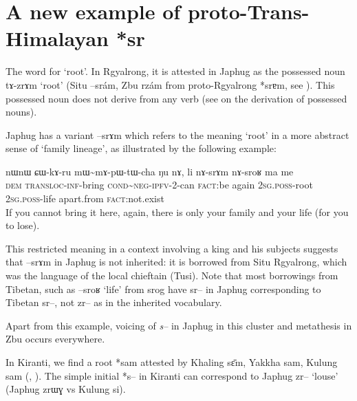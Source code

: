 \documentclass[oldfontcommands,oneside,a4paper,11pt]{article}
\newcommand{\ipa}[1]{{\phon #1}} %
\begin{document}
\section{A new example of proto-Trans-Himalayan *\ipa{sr}}


The word for `root'. In Rgyalrong, it is attested in Japhug as the possessed noun \ipa{tɤ-zrɤm} `root' (Situ \ipa{--srám}, Zbu \ipa{rzám} from proto-Rgyalrong *\ipa{srɐm}, see \citealt[243]{jacques04these}). This possessed noun does not derive from any verb (see \citealt[3-7]{jacques14antipassive} on the derivation of possessed nouns).

Japhug has a variant \ipa{--srɤm} which refers to the meaning `root' in a more abstract sense of `family lineage', as illustrated by the following example:

\begin{exe}
\ex \label{ex:sram}
\gll
\ipa{nɯnɯ} 	\ipa{ɕɯ-kɤ-ru} 	\ipa{mɯ\textasciitilde{}mɤ-pɯ-tɯ-cha} 	\ipa{ŋu} 	\ipa{nɤ,} 	\ipa{li} 	\ipa{nɤ-srɤm} 	\ipa{nɤ-sroʁ} 	\ipa{ma} 	\ipa{me} \\
\textsc{dem} \textsc{transloc-inf}-bring \textsc{cond\textasciitilde{}neg-ipfv}-2-can \textsc{fact}:be again \textsc{2sg.poss}-root \textsc{2sg.poss}-life apart.from \textsc{fact}:not.exist\\
\glt If you cannot bring it here, again, there is only your family and your life (for you to lose).
\end{exe}

This restricted meaning in a context involving a king and his subjects suggests that \ipa{--srɤm} in Japhug is not inherited: it is borrowed from Situ Rgyalrong, which was the language of the local chieftain (Tusi). Note that most borrowings from Tibetan, such as \ipa{--sroʁ} `life' from \ipa{srog} have \ipa{sr--} in Japhug corresponding to Tibetan \ipa{sr--}, not \ipa{zr--} as in the inherited vocabulary.

Apart from this example, voicing of \textit{s--} in Japhug in this cluster and metathesis in Zbu occurs everywhere.

In Kiranti, we find a root *sam attested by Khaling \ipa{sɛ̄m}, Yakkha  \ipa{sam}, Kulung \ipa{sam} (\citealt{kongren07yakkha}, \citealt{tolsma06kulung}). The simple initial *s-- in Kiranti can correspond to Japhug \ipa{zr--} `louse' (Japhug \ipa{zrɯɣ} vs Kulung \ipa{si}).
\end{document}
